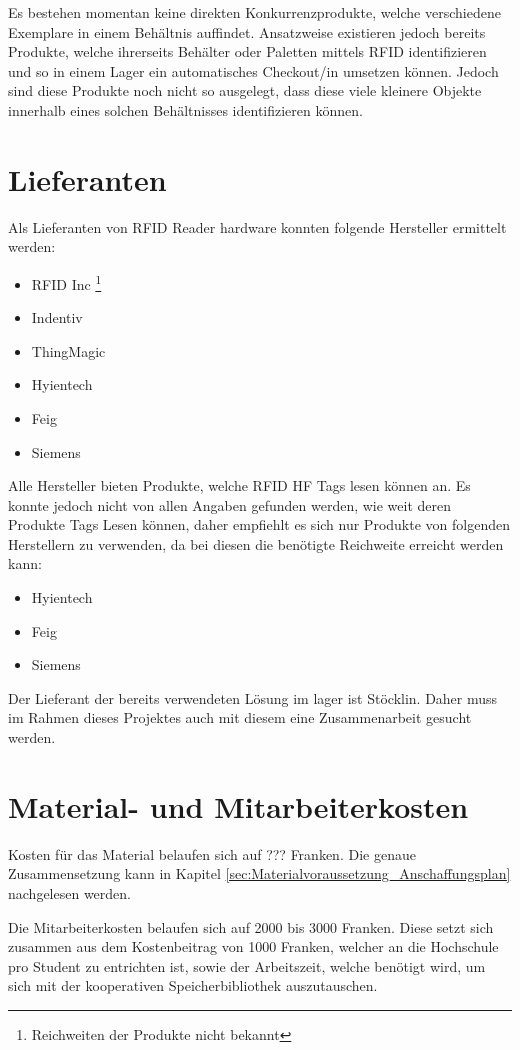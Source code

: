 Es bestehen momentan keine direkten Konkurrenzprodukte, welche verschiedene Exemplare in einem Behältnis auffindet. Ansatzweise existieren jedoch bereits Produkte, welche ihrerseits Behälter oder Paletten mittels RFID identifizieren und so in einem Lager ein automatisches Checkout/in umsetzen können. Jedoch sind diese Produkte noch nicht so ausgelegt, dass diese viele kleinere Objekte innerhalb eines solchen Behältnisses identifizieren können.

\section{Lieferanten}
Als Lieferanten von RFID Reader hardware konnten folgende Hersteller ermittelt werden:
\renewcommand*{\thefootnote}{\fnsymbol{footnote}}
\begin{itemize}
	\item RFID Inc \footnote[1]{\label{note:range_unknown}Reichweiten der Produkte nicht bekannt}
	\item Indentiv \hyperref[note:range_unknown]{\footnotemark[1]}
	\item ThingMagic \hyperref[note:range_unknown]{\footnotemark[1]}
	\item Hyientech
	\item Feig
	\item Siemens
\end{itemize}
\renewcommand*{\thefootnote}{\arabic{footnote}}

Alle Hersteller bieten Produkte, welche RFID HF Tags lesen können an. Es konnte jedoch nicht von allen Angaben gefunden werden, wie weit deren Produkte Tags Lesen können, daher empfiehlt es sich nur Produkte von folgenden Herstellern zu verwenden, da bei diesen die benötigte Reichweite erreicht werden kann:
\begin{itemize}
	\item Hyientech
	\item Feig
	\item Siemens
\end{itemize}

Der Lieferant der bereits verwendeten Lösung im lager ist Stöcklin. Daher muss im Rahmen dieses Projektes auch mit diesem eine Zusammenarbeit gesucht werden.

\section{Material- und Mitarbeiterkosten}
Kosten für das Material belaufen sich auf ??? Franken. Die genaue Zusammensetzung kann in Kapitel \ref{sec:Materialvoraussetzung_Anschaffungsplan} nachgelesen werden.

Die Mitarbeiterkosten belaufen sich auf 2000 bis 3000 Franken. Diese setzt sich zusammen aus dem Kostenbeitrag von 1000 Franken, welcher an die Hochschule pro Student zu entrichten ist, sowie der Arbeitszeit, welche benötigt wird, um sich mit der kooperativen Speicherbibliothek auszutauschen.

